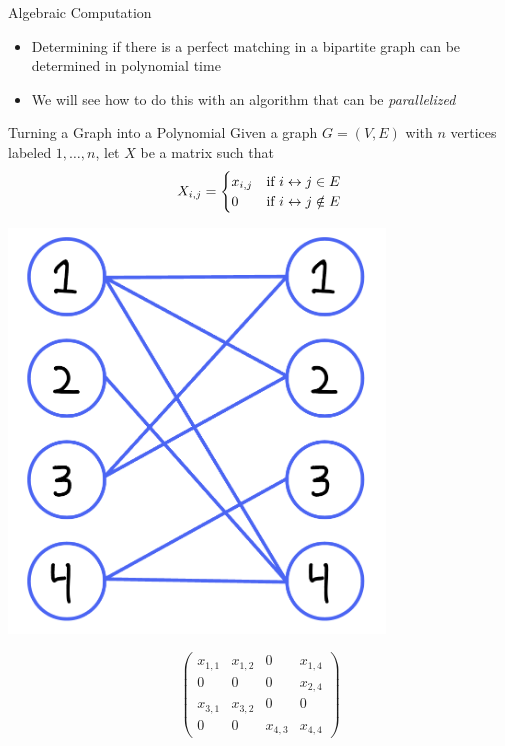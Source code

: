\documentclass[aspectratio=169]{beamer}
\begin{document}
\begin{frame}{Algebraic Computation}
    \begin{itemize}
        \item Determining if there is a perfect matching in a bipartite graph can be determined in polynomial time \pause
        \item We will see how to do this with an algorithm that can be \emph{parallelized}
    \end{itemize}
\end{frame}

\begin{frame}{Turning a Graph into a Polynomial}
    Given a graph $G = (V, E)$ with $n$ vertices labeled $1, \ldots, n$, let $X$ be a matrix such that 
    \[
        X_{i, j} = \begin{cases}
                        x_{i, j} & \text{if } i \leftrightarrow j \in E \\
                        0        & \text{if } i \leftrightarrow j \notin E \\
                    \end{cases}
    \]
    \begin{minipage}{0.45\textwidth}
        \includegraphics[width=0.75\textwidth]{G.png}
    \end{minipage}\hfill
    \begin{minipage}{0.45\textwidth}
        $$
            \begin{pmatrix}
                x_{1, 1} & x_{1, 2} &    0     & x_{1, 4} \\
                    0    &    0     &    0     & x_{2, 4} \\
                x_{3, 1} & x_{3, 2} &    0     &    0     \\
                    0    &    0     & x_{4, 3} & x_{4, 4} 
            \end{pmatrix}
        $$
    \end{minipage}
\end{frame}
\end{document}
